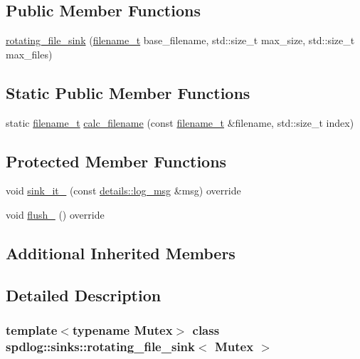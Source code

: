 \subsection*{Public Member Functions}
\begin{DoxyCompactItemize}
\item 
\hyperlink{classspdlog_1_1sinks_1_1rotating__file__sink_a0e754181168b32e8b1b60b82c35179e8}{rotating\+\_\+file\+\_\+sink} (\hyperlink{namespacespdlog_acf7ce125b3622e44f8f1702d699e0b06}{filename\+\_\+t} base\+\_\+filename, std\+::size\+\_\+t max\+\_\+size, std\+::size\+\_\+t max\+\_\+files)
\end{DoxyCompactItemize}
\subsection*{Static Public Member Functions}
\begin{DoxyCompactItemize}
\item 
static \hyperlink{namespacespdlog_acf7ce125b3622e44f8f1702d699e0b06}{filename\+\_\+t} \hyperlink{classspdlog_1_1sinks_1_1rotating__file__sink_a05d77d7013bc54f55cac702c122ac1c9}{calc\+\_\+filename} (const \hyperlink{namespacespdlog_acf7ce125b3622e44f8f1702d699e0b06}{filename\+\_\+t} \&filename, std\+::size\+\_\+t index)
\end{DoxyCompactItemize}
\subsection*{Protected Member Functions}
\begin{DoxyCompactItemize}
\item 
void \hyperlink{classspdlog_1_1sinks_1_1rotating__file__sink_a3cf93e445ad92380c7d352f971cd76a4}{sink\+\_\+it\+\_\+} (const \hyperlink{structspdlog_1_1details_1_1log__msg}{details\+::log\+\_\+msg} \&msg) override
\item 
void \hyperlink{classspdlog_1_1sinks_1_1rotating__file__sink_ae93e4792b76f73bb0be8e50b5c5e889b}{flush\+\_\+} () override
\end{DoxyCompactItemize}
\subsection*{Additional Inherited Members}


\subsection{Detailed Description}
\subsubsection*{template$<$typename Mutex$>$\newline
class spdlog\+::sinks\+::rotating\+\_\+file\+\_\+sink$<$ Mutex $>$}



